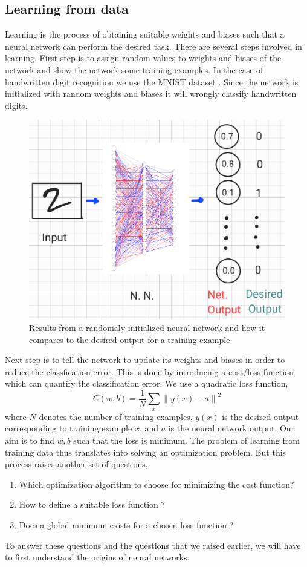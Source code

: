 \subsection{Learning from data}
Learning is the process of obtaining suitable weights and biases such that a neural network can perform
the desired task. There are several steps involved in learning. First step is to assign random values to 
weights and biases of the network and show the network some training examples. In the case of handwritten digit recognition
we use the MNIST dataset \cite{lecun1998mnist}. Since the network is initialized with random weights and biases it will wrongly classify handwritten digits. 
\begin{figure}[htbp]
    \centering
    \includegraphics[width=.4\textwidth]{Figures/rand_inp.png}
    \caption{Results from a randomaly initialized neural network and how it compares to the desired output for a training example}
    \label{fig:randinp}
\end{figure} 
Next step is to tell the network to update its weights and biases in order to reduce the classfication error. This is done by introducing a 
cost/loss function which can quantify the classification error. We use a quadratic loss function, 
$$C(w,b) = \frac{1}{N} \sum_x {\|y(x) - a\|}^2$$
where $N$ denotes the number of training examples, $y(x)$ is the desired output corresponding to training example $x$, and 
$a$ is the neural network output. Our aim is to find $w,b$ such that the loss is minimum. The problem of learning from training data thus translates into
solving an optimization problem. But this process raises another set of questions,
\begin{enumerate}
    \item Which optimization algorithm to choose for minimizing the cost function?
    \item How to define a suitable loss function ?
    \item Does a global minimum exists for a chosen loss function ?
\end{enumerate}
To answer these questions and the questions that we raised earlier, we will have to first understand the origins of neural networks.
